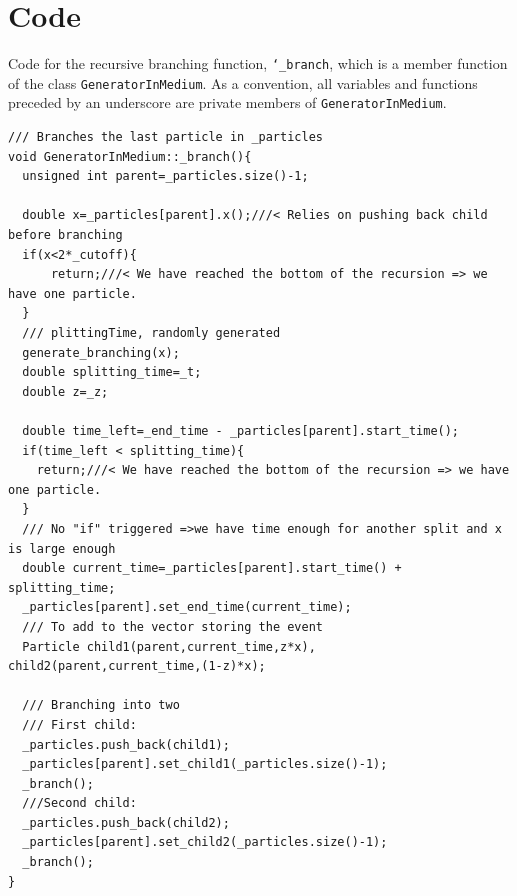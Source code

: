 \documentclass[a4paper,12pt]{article}
\numberwithin{equation}{section}
\begin{document}
\newpage
\section{Code}\label{code}
Code for the recursive branching function, {\tt \char`_branch}, which is a member function of the class {\tt GeneratorInMedium}. As a convention, all variables and functions preceded by an underscore are private members of {\tt GeneratorInMedium}. 

\begin{lstlisting}
/// Branches the last particle in _particles
void GeneratorInMedium::_branch(){
  unsigned int parent=_particles.size()-1;

  double x=_particles[parent].x();///< Relies on pushing back child before branching
  if(x<2*_cutoff){
      return;///< We have reached the bottom of the recursion => we have one particle.
  }
  /// plittingTime, randomly generated
  generate_branching(x);
  double splitting_time=_t;
  double z=_z;

  double time_left=_end_time - _particles[parent].start_time();
  if(time_left < splitting_time){
    return;///< We have reached the bottom of the recursion => we have one particle.
  }
  /// No "if" triggered =>we have time enough for another split and x is large enough
  double current_time=_particles[parent].start_time() + splitting_time;
  _particles[parent].set_end_time(current_time);
  /// To add to the vector storing the event
  Particle child1(parent,current_time,z*x), child2(parent,current_time,(1-z)*x);

  /// Branching into two
  /// First child:
  _particles.push_back(child1);
  _particles[parent].set_child1(_particles.size()-1);
  _branch();
  ///Second child:
  _particles.push_back(child2);
  _particles[parent].set_child2(_particles.size()-1);
  _branch();
}
\end{lstlisting}
\end{document}
